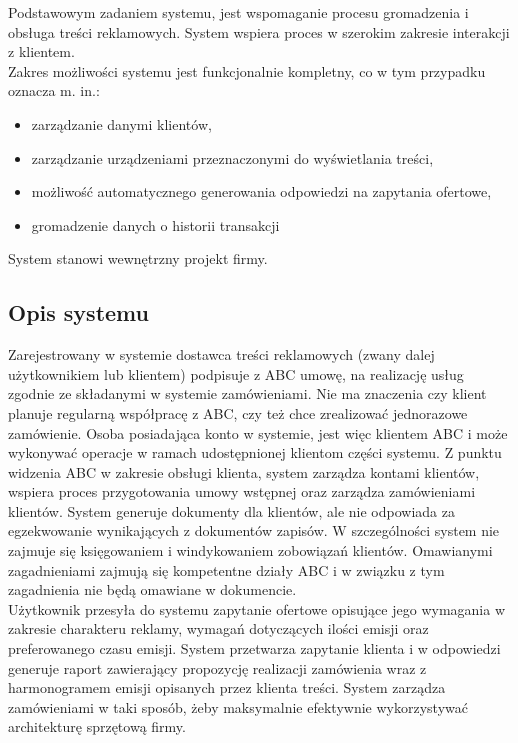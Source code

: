 \documentclass[10pt,a4paper,titlepage]{article} %
\begin{document}
		Podstawowym zadaniem systemu, jest wspomaganie procesu gromadzenia i obsługa
		treści reklamowych. System wspiera proces w szerokim zakresie interakcji z
		klientem.\\
		
		Zakres możliwości systemu jest funkcjonalnie kompletny, co w tym przypadku
		oznacza m. in.:\\
		
		\begin{itemize}
		\item zarządzanie danymi klientów,
		\item zarządzanie urządzeniami przeznaczonymi do wyświetlania treści,
		\item możliwość automatycznego generowania odpowiedzi na zapytania
		ofertowe,
		\item gromadzenie danych o historii transakcji
		\end{itemize}

		
		System stanowi wewnętrzny projekt firmy.
	
		\subsection{Opis systemu}
		Zarejestrowany w systemie dostawca treści reklamowych (zwany dalej użytkownikiem
		lub klientem) podpisuje z ABC umowę, na realizację usług zgodnie ze składanymi
		w systemie zamówieniami. Nie ma znaczenia czy klient planuje regularną
		współpracę z ABC, czy też chce zrealizować jednorazowe zamówienie. Osoba posiadająca
		konto w systemie, jest więc klientem ABC i może wykonywać operacje w ramach
		udostępnionej klientom części systemu. Z punktu widzenia ABC w zakresie obsługi
		klienta, system zarządza kontami klientów, wspiera proces przygotowania umowy wstępnej
		oraz zarządza zamówieniami klientów. System generuje dokumenty dla klientów, ale
		nie odpowiada za egzekwowanie wynikających z dokumentów zapisów. W szczególności
		system nie zajmuje się księgowaniem i windykowaniem zobowiązań klientów.
		Omawianymi zagadnieniami zajmują się kompetentne działy ABC i w związku z tym
		zagadnienia nie będą omawiane w dokumencie.\\
		
		Użytkownik przesyła do systemu zapytanie ofertowe opisujące jego wymagania w zakresie
		charakteru reklamy, wymagań dotyczących ilości emisji oraz preferowanego
		czasu emisji. System przetwarza zapytanie klienta i w odpowiedzi generuje
		raport zawierający propozycję realizacji zamówienia wraz z harmonogramem
		emisji opisanych przez klienta treści. System zarządza zamówieniami w
		taki sposób, żeby maksymalnie efektywnie wykorzystywać architekturę
		sprzętową firmy.\\
\end{document}

